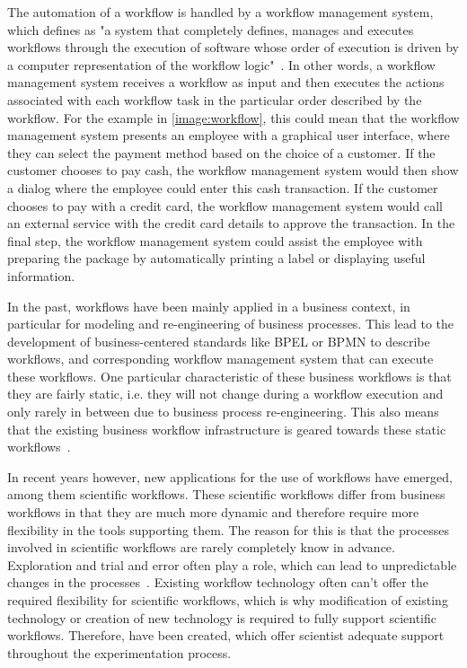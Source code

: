 The automation of a workflow is handled by a workflow management system, which \citeauthor*{workflow:referencemodel} defines as "a system that completely defines, manages and executes workflows through the execution of software whose order of execution is driven by a computer representation of the workflow logic"~\autocite{workflow:referencemodel}.
In other words, a workflow management system receives a workflow as input and then executes the actions associated with each workflow task in the particular order described by the workflow.
For the example in \autoref{image:workflow}, this could mean that the workflow management system presents an employee with a graphical user interface, where they can select the payment method based on the choice of a customer.
If the customer chooses to pay cash, the workflow management system would then show a dialog where the employee could enter this cash transaction.
If the customer chooses to pay with a credit card, the workflow management system would call an external service with the credit card details to approve the transaction.
In the final step, the workflow management system could assist the employee with preparing the package by automatically printing a label or displaying useful information.

In the past, workflows have been mainly applied in a business context, in particular for modeling and re-engineering of business processes.
This lead to the development of business-centered standards like BPEL or BPMN to describe workflows, and corresponding workflow management system that can execute these workflows.
One particular characteristic of these business workflows is that they are fairly static, i.e. they will not change during a workflow execution and only rarely in between due to business process re-engineering.
This also means that the existing business workflow infrastructure is geared towards these static workflows~\autocite{wasa}.

In recent years however, new applications for the use of workflows have emerged, among them scientific workflows.
These scientific workflows differ from business workflows in that they are much more dynamic and therefore require more flexibility in the tools supporting them.
The reason for this is that the processes involved in scientific workflows are rarely completely know in advance.
Exploration and trial and error often play a role, which can lead to unpredictable changes in the processes~\autocite{wasa}.
Existing workflow technology often can't offer the required flexibility for scientific workflows, which is why modification of existing technology or creation of new technology is required to fully support scientific workflows.
Therefore,  have been created, which offer scientist adequate support throughout the experimentation process.
